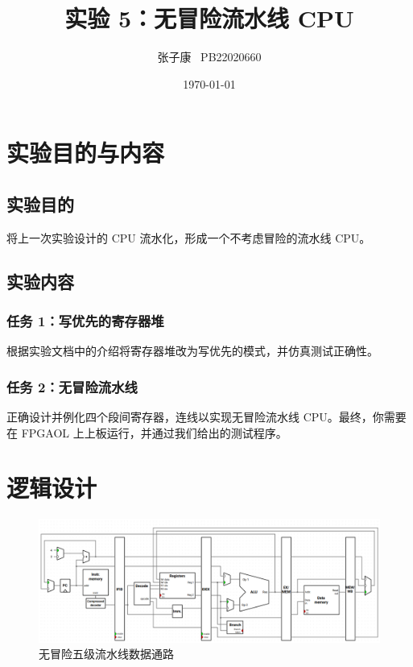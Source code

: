 \documentclass[12pt,a4paper]{ctexart}
\title{实验 5：无冒险流水线 CPU}
\author{张子康 \ PB22020660}
\date{\today}
\begin{document}
\maketitle
\newpage
\section{实验目的与内容}
\subsection{实验目的}
将上一次实验设计的 CPU 流水化，形成一个不考虑冒险的流水线 CPU。
\subsection{实验内容}
\subsubsection{任务 1：写优先的寄存器堆}
根据实验文档中的介绍将寄存器堆改为写优先的模式，并仿真测试正确性。
\subsubsection{任务 2：无冒险流水线}
正确设计并例化四个段间寄存器，连线以实现无冒险流水线 CPU。最终，你需要在 FPGAOL 上上板运行，并通过我们给出的测试程序。
\section{逻辑设计}
\begin{figure}[H]
    \centering
    \includegraphics[scale=0.4]{pic/数据通路.png}
    \caption{无冒险五级流水线数据通路}
\end{figure}
\end{document}
